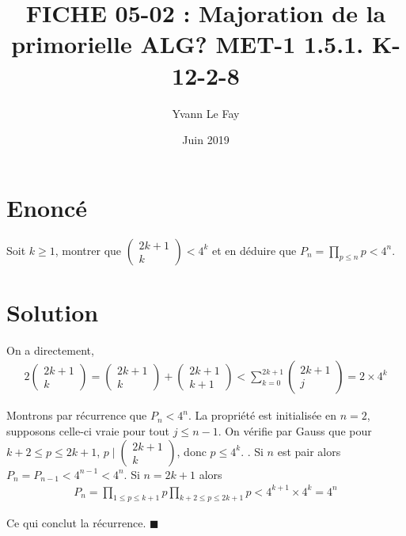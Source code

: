 \documentclass{article}
\newcommand*{\QED}{\hfill\ensuremath{\blacksquare}}%
\begin{document}
\title{FICHE 05-02 : Majoration de la primorielle ALG? MET-1 1.5.1. K-12-2-8}
\author{Yvann Le Fay}
\date{Juin 2019}
\maketitle

\section*{Enoncé}
Soit $k\geq 1$, montrer que $\begin{pmatrix}
2k+1\\k
\end{pmatrix}< 4^k$ et en déduire que $P_n = \prod_{p\leq n}p< 4^n$.
\section*{Solution}
On a directement,
\begin{align*}
2\begin{pmatrix}
2k+1\\k
\end{pmatrix}=\begin{pmatrix}
2k+1\\k
\end{pmatrix}+\begin{pmatrix}
2k+1\\
k+1
\end{pmatrix}<\sum_{k=0}^{2k+1} \begin{pmatrix}
2k+1\\
j
\end{pmatrix}=2\times 4^k
\end{align*}

Montrons par récurrence que $P_n< 4^n$. La propriété est initialisée en $n=2$, supposons celle-ci vraie pour tout $j\leq n-1$. On vérifie par Gauss que pour $k+2\leq p\leq 2k+1$, $p\mid \begin{pmatrix}2k+1\\k\end{pmatrix}$, donc $p\leq 4^k$. . Si $n$ est pair alors $P_{n}=P_{n-1}<4^{n-1}<4^n$. Si $n=2k+1$ alors 
\begin{align*}
P_{n}=\prod_{1\leq p\leq k+1}p \prod_{k+2\leq p \leq 2k+1}p< 4^{k+1}\times 4^{k}=4^n
\end{align*}

Ce qui conclut la récurrence.
\QED
\end{document}
